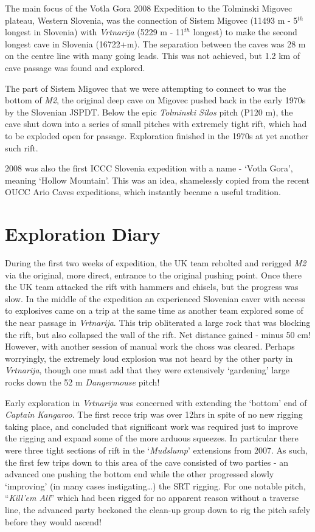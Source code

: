 The main focus of the Votla Gora 2008 Expedition to the Tolminski
Migovec plateau, Western Slovenia, was the connection of Sistem Migovec
(11493 m - 5\(^{th}\) longest in Slovenia) with \emph{Vrtnarija} (5229 m
- 11\(^{th}\) longest) to make the second longest cave in Slovenia
(16722+m). The separation between the caves was 28 m on the centre line
with many going leads. This was not achieved, but 1.2 km of cave passage
was found and explored.

The part of Sistem Migovec that we were attempting to connect to was the
bottom of \emph{M2}, the original deep cave on Migovec pushed back in
the early 1970s by the Slovenian JSPDT. Below the epic \emph{Tolminski
Silos} pitch (P120 m), the cave shut down into a series of small pitches
with extremely tight rift, which had to be exploded open for passage.
Exploration finished in the 1970s at yet another such rift.

2008 was also the first ICCC Slovenia expedition with a name - `Votla
Gora', meaning `Hollow Mountain'. This was an idea, shamelessly copied
from the recent OUCC Ario Caves expeditions, which instantly became a
useful tradition.

\hypertarget{exploration-diary}{%
\section{Exploration Diary}\label{exploration-diary}}

During the first two weeks of expedition, the UK team rebolted and
rerigged \emph{M2} via the original, more direct, entrance to the
original pushing point. Once there the UK team attacked the rift with
hammers and chisels, but the progress was slow. In the middle of the
expedition an experienced Slovenian caver with access to explosives came
on a trip at the same time as another team explored some of the near
passage in \emph{Vrtnarija}. This trip obliterated a large rock that was
blocking the rift, but also collapsed the wall of the rift. Net distance
gained - minus 50 cm! However, with another session of manual work the
choss was cleared. Perhaps worryingly, the extremely loud explosion was
not heard by the other party in \emph{Vrtnarija}, though one must add
that they were extensively `gardening' large rocks down the 52 m
\emph{Dangermouse} pitch!

Early exploration in \emph{Vrtnarija} was concerned with extending the
`bottom' end of \emph{Captain Kangaroo}. The first recce trip was over
12hrs in spite of no new rigging taking place, and concluded that
significant work was required just to improve the rigging and expand
some of the more arduous squeezes. In particular there were three tight
sections of rift in the `\emph{Mudslump}' extensions from 2007. As such,
the first few trips down to this area of the cave consisted of two
parties - an advanced one pushing the bottom end while the other
progressed slowly `improving' (in many cases instigating\ldots{}) the
SRT rigging. For one notable pitch, ``\emph{Kill'em All}'' which had
been rigged for no apparent reason without a traverse line, the advanced
party beckoned the clean-up group down to rig the pitch safely before
they would ascend!

